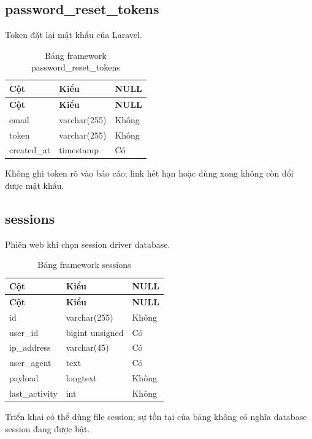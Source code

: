 \subsection{password\_\allowbreak{}reset\_\allowbreak{}tokens}
Token đặt lại mật khẩu của Laravel.\allowbreak{}


{\fontsize{10}{12}\selectfont\setlength{\tabcolsep}{3pt}\renewcommand{\arraystretch}{1.12}
\begin{longtable}{@{}L{\textwidth-5.28pt\relax} L{\textwidth-4.8pt\relax} L{\textwidth-1.92pt\relax}@{}}
\caption{Bảng framework password\_\allowbreak{}reset\_\allowbreak{}tokens}\\
\toprule
\textbf{Cột} & \textbf{Kiểu} & \textbf{NULL}\\\midrule
\endfirsthead
\toprule
\textbf{Cột} & \textbf{Kiểu} & \textbf{NULL}\\\midrule
\endhead
\bottomrule\endlastfoot
email & varchar(255) & Không\\[1pt]
token & varchar(255) & Không\\[1pt]
created\_\allowbreak{}at & timestamp & Có\\[1pt]
\end{longtable}}
{\small Không ghi token rõ vào báo cáo; link hết hạn hoặc dùng xong không còn đổi được mật khẩu.\allowbreak{}

}

\subsection{sessions}
Phiên web khi chọn session driver database.\allowbreak{}


{\fontsize{10}{12}\selectfont\setlength{\tabcolsep}{3pt}\renewcommand{\arraystretch}{1.12}
\begin{longtable}{@{}L{\textwidth-5.28pt\relax} L{\textwidth-4.8pt\relax} L{\textwidth-1.92pt\relax}@{}}
\caption{Bảng framework sessions}\\
\toprule
\textbf{Cột} & \textbf{Kiểu} & \textbf{NULL}\\\midrule
\endfirsthead
\toprule
\textbf{Cột} & \textbf{Kiểu} & \textbf{NULL}\\\midrule
\endhead
\bottomrule\endlastfoot
id & varchar(255) & Không\\[1pt]
user\_\allowbreak{}id & bigint unsigned & Có\\[1pt]
ip\_\allowbreak{}address & varchar(45) & Có\\[1pt]
user\_\allowbreak{}agent & text & Có\\[1pt]
payload & longtext & Không\\[1pt]
last\_\allowbreak{}activity & int & Không\\[1pt]
\end{longtable}}
{\small Triển khai có thể dùng file session; sự tồn tại của bảng không có nghĩa database session đang được bật.\allowbreak{}

}
